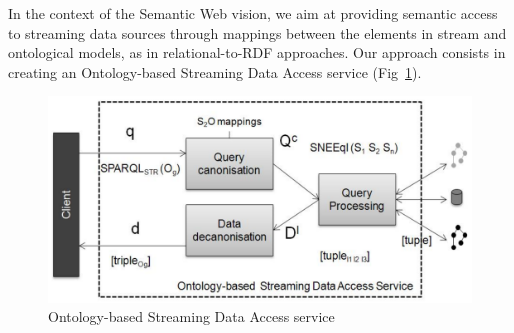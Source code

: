 \documentclass[runningheads,a4paper]{llncs}
\begin{document}

In the context of the Semantic Web vision, we aim at providing semantic access to streaming data sources through mappings between the elements in stream and ontological models, as in relational-to-RDF\cite{Barrasa_04} approaches.%
Our approach consists in creating an Ontology-based Streaming Data Access service (Fig~\ref{fig:SemanticIntegrator}).\ %

\begin{figure}[here]
\vspace{-20pt} \hspace{20pt}
\begin{center}
\includegraphics[width=7 cm]{img/approach}
\end{center}
\vspace{-15pt} \caption{Ontology-based Streaming Data Access service} \label{fig:SemanticIntegrator} \vspace{-15pt}
\end{figure}
\end{document}
